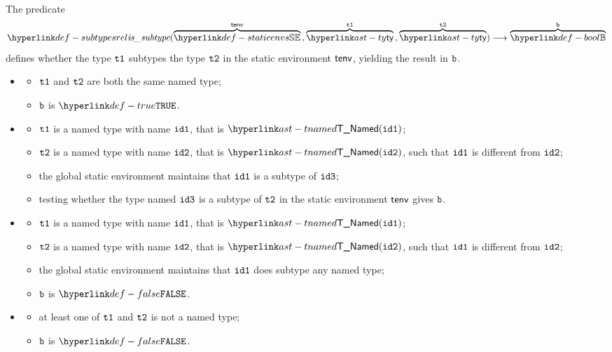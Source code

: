 
\hypertarget{def-subtypesrel}{}
The predicate
\[
  \subtypesrel(\overname{\staticenvs}{\tenv} \aslsep \overname{\ty}{\vtone} \aslsep \overname{\ty}{\vttwo})
  \aslto \overname{\Bool}{\vb}
\]
defines whether the type $\texttt{t1}$ subtypes the type $\texttt{t2}$ in the static environment $\textsf{tenv}$,
yielding the result in $\texttt{b}$.

\ProseParagraph
\OneApplies
\begin{itemize}
  \item {}
  \begin{itemize}
    \item $\texttt{t1}$ and $\texttt{t2}$ are both the same named type;
    \item $\texttt{b}$ is $\True$.
  \end{itemize}

  \item {}
  \begin{itemize}
    \item $\texttt{t1}$ is a named type with name $\texttt{id1}$, that is $\TNamed(\idone)$;
    \item $\texttt{t2}$ is a named type with name $\texttt{id2}$, that is $\TNamed(\idtwo)$, such that $\texttt{id1}$ is different from $\texttt{id2}$;
    \item the global static environment maintains that $\texttt{id1}$ is a subtype of $\texttt{id3}$;
    \item testing whether the type named $\texttt{id3}$ is a subtype of $\texttt{t2}$ in the static environment $\textsf{tenv}$
    gives $\texttt{b}$.
  \end{itemize}

  \item {}
  \begin{itemize}
    \item $\texttt{t1}$ is a named type with name $\texttt{id1}$, that is $\TNamed(\idone)$;
    \item $\texttt{t2}$ is a named type with name $\texttt{id2}$, that is $\TNamed(\idtwo)$, such that $\texttt{id1}$ is different from $\texttt{id2}$;
    \item the global static environment maintains that $\texttt{id1}$ does subtype any named type;
    \item $\texttt{b}$ is $\False$.
  \end{itemize}

  \item {}
  \begin{itemize}
    \item at least one of $\texttt{t1}$ and $\texttt{t2}$ is not a named type;
    \item $\texttt{b}$ is $\False$.
  \end{itemize}
\end{itemize}

